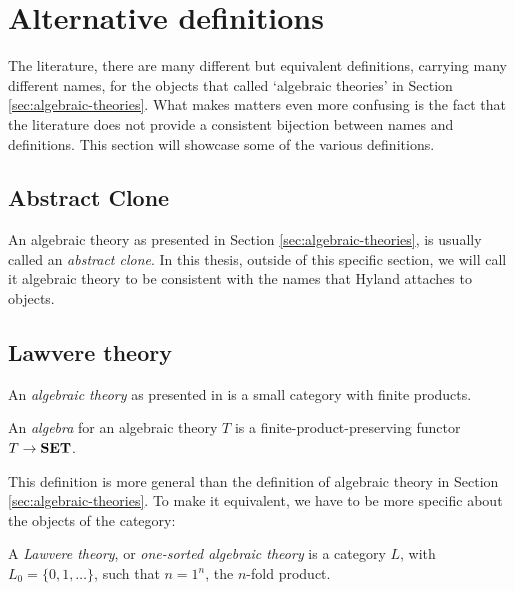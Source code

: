 \chapter{Alternative definitions}
The literature, there are many different but equivalent definitions, carrying many different names, for the objects that called `algebraic theories' in Section \ref{sec:algebraic-theories}. What makes matters even more confusing is the fact that the literature does not provide a consistent bijection between names and definitions. This section will showcase some of the various definitions.


\section{Abstract Clone}
\begin{definition}
  An algebraic theory as presented in Section \ref{sec:algebraic-theories}, is usually called an \textit{abstract clone}. In this thesis, outside of this specific section, we will call it algebraic theory to be consistent with the names that Hyland attaches to objects.
\end{definition}

\section{Lawvere theory}
\begin{definition}
  An \textit{algebraic theory} as presented in \cite{algebaric-theories-2010} is a small category with finite products.
\end{definition}
\begin{definition}
  An \textit{algebra} for an algebraic theory $ T $ is a finite-product-preserving functor $ T \to \mathbf{SET} $.
\end{definition}

This definition is more general than the definition of algebraic theory in Section \ref{sec:algebraic-theories}. To make it equivalent, we have to be more specific about the objects of the category:
\begin{definition}
  A \textit{Lawvere theory}, or \textit{one-sorted algebraic theory} is a category $ L $, with $ L_0 = \{ 0, 1, \dots \} $, such that $ n = 1^n $, the $ n $-fold product.
\end{definition}

